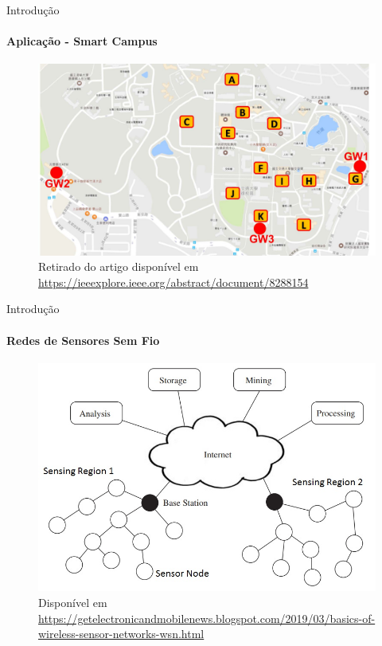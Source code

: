 \documentclass[c]{beamer}
\begin{document}
\begin{darkframes}
  \begin{frame}{Introdução}
    \framesubtitle{Aplicação - Smart Campus}
    \begin{figure}[ht]
      \centering
      \includegraphics[width=.9\textwidth]{resources/smart-campus-locations.png}\\
      \footnotesize{Retirado do artigo disponível em \url{https://ieeexplore.ieee.org/abstract/document/8288154}}
    \end{figure}
  \end{frame}

  \begin{frame}{Introdução}
    \framesubtitle{Redes de Sensores Sem Fio}
    \begin{figure}[ht]
      \centering
      \includegraphics[width=.8\textwidth]{resources/Wireless-Sensor-Networks-WSN.jpg}\\
      \footnotesize{Disponível em  \url{https://getelectronicandmobilenews.blogspot.com/2019/03/basics-of-wireless-sensor-networks-wsn.html}}
    \end{figure}
  \end{frame}



\end{darkframes}
\end{document}
